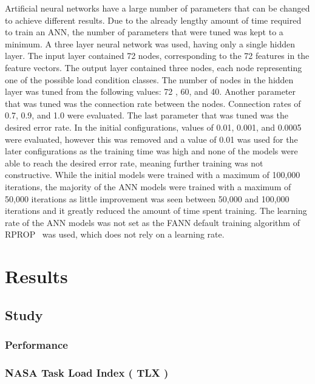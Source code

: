 \documentclass[11pt]{article}
\begin{document}
		Artificial neural networks have a large number of parameters that can be changed to achieve different results. Due to the already lengthy amount of time required to train an ANN, the number of parameters that were tuned was kept to a minimum. A three layer neural network was used, having only a single hidden layer. The input layer contained 72 nodes, corresponding to the 72 features in the feature vectors. The output layer contained three nodes, each node representing one of the possible load condition classes. The number of nodes in the hidden layer was tuned from the following values: 72 , 60, and 40. Another parameter that was tuned was the connection rate between the nodes. Connection rates of 0.7, 0.9, and 1.0 were evaluated. The last parameter that was tuned was the desired error rate. In the initial configurations, values of 0.01, 0.001, and 0.0005 were evaluated, however this was removed and a value of 0.01 was used for the later configurations as the training time was high and none of the models were able to reach the desired error rate, meaning further training was not constructive. While the initial models were trained with a maximum of 100,000 iterations, the majority of the ANN models were trained with a maximum of 50,000 iterations as little improvement was seen between 50,000 and 100,000 iterations and it greatly reduced the amount of time spent training. The learning rate of the ANN models was not set as the FANN default training algorithm of RPROP~\cite{} was used, which does not rely on a learning rate.

\section{Results}

	\subsection{Study}
		
		\subsubsection{Performance}
		
		\subsubsection{NASA Task Load Index ( TLX )}
		
\end{document}
